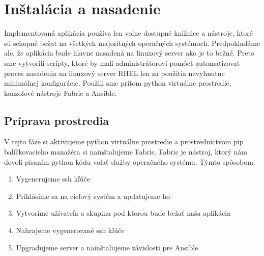 \chapter{Inštalácia a nasadenie}
Implementovaná aplikácia používa len voľne dostupné knižnice a nástroje, ktoré sú schopné bežat na všetkých majoritných operačných systémoch. Predpokladáme ale, že aplikácia bude hlavne nasadená na linuxový server ako je to bežné. Preto sme vytvorili scripty, ktoré by mali administrátorovi pomôcť automatizovať proces nasadenia na linuxový server RHEL len za použitia nevyhnutne minimálnej konfigurácie. Použili sme pritom python virtuálne prostredie, konzolové nástroje Fabric a Ansible.

\section{Príprava prostredia}
V tejto fáze si aktivujeme python virtuálne prostredie a prostredníctvom pip balíčkovacieho manažéra si nainštalujeme Fabric.
Fabric je nástroj, ktorý nám dovolí písaním python kódu volať služby operačného systému. Týmto spôsobom: 

\begin{enumerate}
  \item Vygenerujeme ssh kľúče
  \item Prihlásime sa na cieľový systém a updatujeme ho
  \item Vytvoríme užívateľa a skupinu pod ktorou bude bežať naša aplikácia
  \item Nahrajeme vygenerované ssh kľúče
  \item Upgradujeme server a nainštalujeme závislosti pre Ansible
\end{enumerate}
